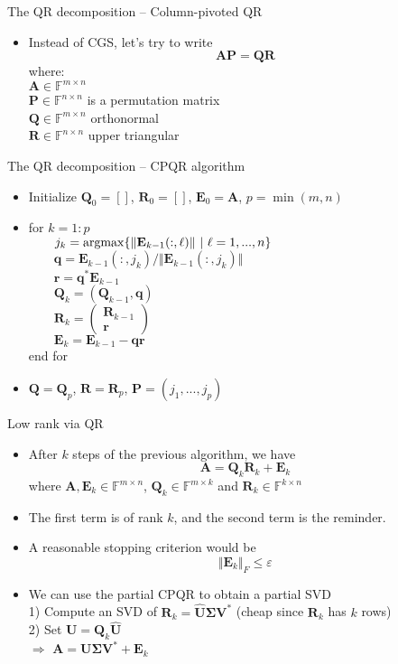 \documentclass{beamer}
\newcommand{\bgk}[1]{\boldsymbol{#1}}
\newcommand{\bSigma}{\bgk{\Sigma}}
\newcommand{\bvec}[1]{\mathbf{#1}}
\newcommand{\vq}{\bvec{q}}
\newcommand{\vr}{\bvec{r}}
\newcommand{\vA}{\bvec{A}}
\newcommand{\vE}{\bvec{E}}
\newcommand{\vP}{\bvec{P}}
\newcommand{\vQ}{\bvec{Q}}
\newcommand{\vR}{\bvec{R}}
\newcommand{\vU}{\bvec{U}}
\newcommand{\vV}{\bvec{V}}
\newcommand{\bitem}{\item[$\bullet$]}
\begin{document}
\begin{frame}{The QR decomposition -- Column-pivoted QR}
\begin{itemize}
    \bitem Instead of CGS, let's try to write
    $$
    \vA \vP = \vQ \vR
    $$
    where:\\
    $\vA \in \mathbb{F}^{m \times n}$\\
    $\vP \in \mathbb{F}^{n \times n}$ is a permutation matrix\\
    $\vQ\in\mathbb{F}^{m \times n}$ orthonormal\\ 
    $\vR\in\mathbb{F}^{n \times n}$ upper triangular
\end{itemize}
\end{frame}

\begin{frame}{The QR decomposition -- CPQR algorithm}
\begin{itemize}
    \bitem Initialize $\vQ_0 = []$, $\vR_0 = []$, $\vE_0 = \vA$, $p = \min(m,n)$
    \bitem for $k = 1 : p$\\
    $\qquad j_k = {\rm argmax} \{ \Vert \vE_{k-1}(:,\ell)\Vert ~|~ \ell =1,...,n\}$\\
    $\qquad \vq = \vE_{k-1}(:,j_k)/ \Vert \vE_{k-1}(:,j_k) \Vert$\\
    $\qquad \vr = \vq^* \vE_{k-1}$\\
    $\qquad \vQ_k = (\vQ_{k-1}, \vq)$\\
    $\qquad \vR_k = \begin{pmatrix}
    \vR_{k-1}\\ \vr
    \end{pmatrix}$\\
    $\qquad \vE_k = \vE_{k-1} - \vq \vr$\\
    end for
    \bitem $\vQ = \vQ_p$, $\vR = \vR_p$, $\vP = (j_1, ..., j_p)$
\end{itemize}
\end{frame}

\begin{frame}{Low rank via QR}
\begin{itemize}
    \bitem After $k$ steps of the previous algorithm, we have
    $$
    \vA = \vQ_k \vR_k + \vE_k
    $$
    where $\vA, \vE_k \in \mathbb{F}^{m \times n}$, $\vQ_k \in \mathbb{F}^{m \times k}$ and $\vR_k \in \mathbb{F}^{k \times n}$
    \bitem The first term is of rank $k$, and the second term is the reminder.
    \bitem A reasonable stopping criterion would be 
    $$
    \Vert \vE_k \Vert_F \leq \varepsilon
    $$
    \bitem We can use the partial CPQR to obtain a partial SVD\\
    1) Compute an SVD of $\vR_k = \hat{\vU}\bSigma \vV^*$ (cheap since $\vR_k$ has $k$ rows)\\
    2) Set $\vU = \vQ_k \hat{\vU}$\\
    $\Rightarrow$ $\vA = \vU \bSigma \vV^* + \vE_k$
\end{itemize}
\end{frame}
\end{document}

